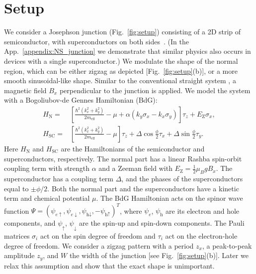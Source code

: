 \documentclass[english, twocolumn, 10pt, aps, superscriptaddress, floatfix, prb, citeautoscript]{revtex4-1}
\renewcommand{\comment}[2]{#2}
\begin{document}
\section{Setup}\label{sec:setup}

\comment{We consider a two-dimensional system with zigzag and BdG Hamiltonian.}
We consider a Josephson junction (Fig.~\ref{fig:setup}) consisting of a 2D strip of semiconductor, with superconductors on both sides~\cite{Pientka2017,Hell2017}.
(In the App.~\ref{appendix:NS_junction} we demonstrate that similar physics also occurs in devices with a single superconductor.)
We modulate the shape of the normal region, which can be either zigzag as depicted [Fig.~\ref{fig:setup}(b)], or a more smooth sinusoidal-like shape.
Similar to the conventional straight system \cite{Pientka2017}, a magnetic field $B_x$ perpendicular to the junction is applied.
We model the system with a Bogoliubov-de Gennes Hamiltonian (BdG):
\begin{subequations}
\begin{align}
    H_\textrm{N} = & \left[\frac{\hbar^2\left(k_x^2 + k_y^2\right)}{2m_\text{eff}} - \mu + \alpha \left( k_y \sigma_x - k_x \sigma_y \right) \right] \tau_z
        + E_\text{Z} \sigma_x, \\
    H_\textrm{SC} = & \left[\frac{\hbar^2\left(k_x^2 + k_y^2\right)}{2m_\text{eff}} - \mu\right] \tau_z
        + \Delta \cos{\frac{\phi}{2}} \tau_x + \Delta \sin{\frac{\phi}{2}} \tau_y.
\end{align}
\label{eq:hamiltonian}
\end{subequations}
Here $H_\textrm{N}$ and $H_\textrm{SC}$ are the Hamiltonians of the semiconductor and superconductors, respectively.
The normal part has a linear Rashba spin-orbit coupling term with strength $\alpha$ and a Zeeman field with $E_\text{Z}=\frac{1}{2} \mu_B g B_x$.
The superconductor has a coupling term $\Delta$, and the phases of the superconductors equal to $\pm\phi/2$.
Both the normal part and the superconductors have a kinetic term and chemical potential $\mu$.
The BdG Hamiltonian acts on the spinor wave function $\Psi={\left(\psi_{e\uparrow},\psi_{e\downarrow},\psi_{\textrm{h}\downarrow},-\psi_{\textrm{h}\uparrow}\right)}^{T}$, where $\psi_e$, $\psi_\textrm{h}$ are its electron and hole components, and $\psi_\uparrow$, $\psi_\downarrow$ are the spin-up and spin-down components.
The Pauli matrices $\sigma_{i}$ act on the spin degree of freedom and $\tau_{i}$ act on the electron-hole degree of freedom.
We consider a zigzag pattern with a period $z_x$, a peak-to-peak amplitude $z_y$, and $W$ the width of the junction [see Fig.~\ref{fig:setup}(b)].
Later we relax this assumption and show that the exact shape is unimportant.
\end{document}

